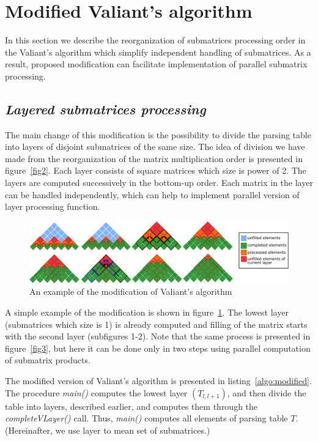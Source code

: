 \section{\bf Modified Valiant's algorithm}

In this section we describe the reorganization of submatrices processing order in the Valiant's algorithm which simplify independent handling of submatrices. As a result, proposed modification can facilitate implementation of parallel submatrix processing.

\subsection{\bf \it Layered submatrices processing}

The main change of this modification is the possibility to divide the parsing table into layers of disjoint submatrices of the same size.
The idea of division we have made from the reorganization of the matrix multiplication order is presented in figure~\ref{fig2}.
Each layer consists of square matrices which size is power of 2.
The layers are computed successively in the bottom-up order.
Each matrix in the layer can be handled independently, which can help to implement parallel version of layer processing function.

\begin{figure}[h]
\vspace{3mm}
 \begin{center}
 \includegraphics[width=12cm]{pictures/modivis2.pdf}
    \caption{An example of the modification of Valiant's algorithm}
    \label{fig4}
 \end{center}
\vspace{-8mm}
\end{figure}

A simple example of the modification is shown in figure~\ref{fig4}.
The lowest layer (submatrices which size is 1) is already computed and filling of the matrix starts with the second layer (subfigures 1-2).
Note that the same process is presented in figure~\ref{fig3}, but here it can be done only in two steps using parallel computation of submatrix products.

The modified version of Valiant's algorithm is presented in listing~\ref{algo:modified}.
The procedure \textit{main()} computes the lowest layer $(T_{l, l+1})$, and then divide the table into layers, described earlier, and computes them through the \textit{completeVLayer()} call.
Thus, \textit{main()} computes all elements of parsing table $T$.
(Hereinafter, we use layer to mean set of submatrices.)

